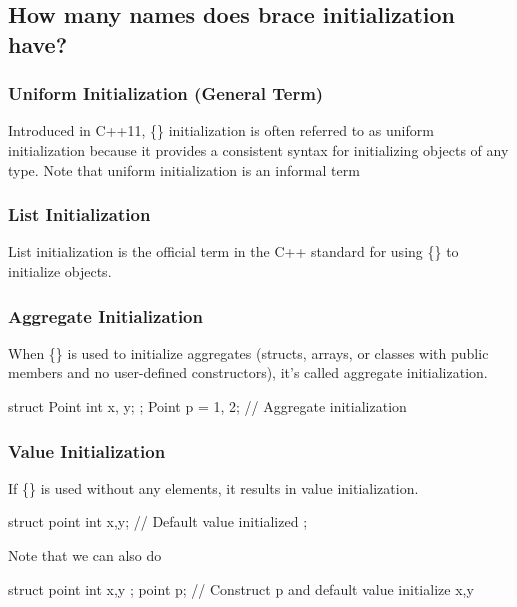 \documentclass{report}
\begin{document}
    \pagebreak 
    \bigbreak \noindent 
    \subsection{How many names does brace initialization have?}
    \bigbreak \noindent 
    \subsubsection{Uniform Initialization (General Term)}
    \bigbreak \noindent 
    Introduced in C++11, \{\} initialization is often referred to as uniform initialization because it provides a consistent syntax for initializing objects of any type.
    \bigbreak \noindent 
    Note that uniform initialization is an informal term


    \bigbreak \noindent 
    \subsubsection{List Initialization}
    \bigbreak \noindent 
    List initialization is the official term in the C++ standard for using \{\} to initialize objects.

    \bigbreak \noindent 
    \subsubsection{Aggregate Initialization}
    \bigbreak \noindent 
    When \{\} is used to initialize aggregates (structs, arrays, or classes with public members and no user-defined constructors), it's called aggregate initialization.
    \bigbreak \noindent 
    \begin{cppcode}
        struct Point {
            int x, y;
        };
        Point p = {1, 2}; // Aggregate initialization
    \end{cppcode}


    \bigbreak \noindent 
    \subsubsection{Value Initialization}
    \bigbreak \noindent 
    If \{\} is used without any elements, it results in value initialization.
    \bigbreak \noindent 
    \begin{cppcode}
        struct  point {
            int x{},y{}; // Default value initialized
        };
    \end{cppcode}
    \bigbreak \noindent 
    Note that we can also do
    \bigbreak \noindent 
    \begin{cppcode}
        struct point {
            int x,y
        };
        point p{}; // Construct p and default value initialize x,y
    \end{cppcode}
\end{document}
